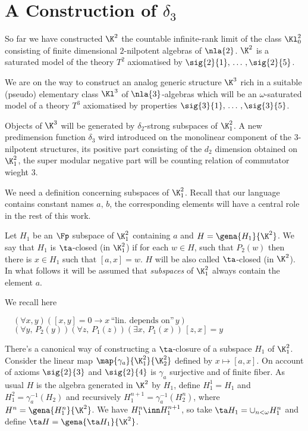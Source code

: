 \section{A Construction of $\delta_{3}$}
So far we have constructed $\K^{2}$ the countable  infinite-rank limit of the class $\Kl^{2}_{0}$ consisting of
finite dimensional $2$-nilpotent algebras of $\nla{2}$.
$\K^{2}$ is a saturated model of the theory
$T^{2}$ axiomatised by $\sig{2}{1},\,\dots\,,\sig{2}{5}$.

We are on the way to construct an analog generic structure $\K^{3}$ rich in a suitable (pseudo) elementary
class $\Kl^{3}$ of $\nla{3}$-algebras which will be an $\omega$-saturated model of a theory $T^{3}$
axiomatised by properties $\sig{3}{1},\,\dots\,,\sig{3}{5}$.

Objects of $\K^{3}$ will be generated by $\delta_{2}$-strong subspaces of $\K^{2}_{1}$.
A new predimension function $\delta_{3}$ wird introduced on the monolinear component of the
$3$-nilpotent structures, its positive part consisting of the $d_{2}$ dimension obtained
on $\K^{2}_{1}$, the super modular negative part will be counting relation of commutator wieght $3$.

\medskip
We need a definition concerning subspaces of $\K^{2}_{1}$.
Recall that our language contains constant names $a,\,b$, the corresponding elements
will have a central role in the rest of this work.

Let $H_{1}$ be an $\Fp$ subspace of $\K^{2}_{1}$ containing
$a$ and $H=\gena{H_{1}}{\K^{2}}$.
We say that $H_{1}$ is $\ta$-closed (in $\K^{2}_{1}$) if for each $w\in H$, such that
$P_{2}(w)$ then there is $x\in H_{1}$ such that $[a,x]=w$. $H$ will be also called
$\ta$-closed (in $\K^{2}$).
In what follows it will be assumed that \emph{subspaces} of $\K^{2}_{1}$
always contain the element $a$.

We recall here

\begin{itemize}
$\quad(\forall x,y)([x,y]=0\rightarrow x\,\text{``lin. depends on''}\,y)$
$\quad(\forall y,\,P_{2}(y))(\forall z,\,P_{1}(z))(\exists x,\,P_{1}(x))\,[z,x]=y$
\end{itemize}

There's a canonical way of constructing a $\ta$-closure of a subspace $H_{1}$ of $\K^{2}_{1}$.
Consider the linear map $\map{\gamma_{a}}{\K^{2}_{1}}{\K^{2}_{2}}$ defined by $x\mapsto[a,x]$.
On account of axioms $\sig{2}{3}$ and $\sig{2}{4}$ is $\gamma_{a}$ surjective and of finite fiber.
As usual $H$ is the algebra generated in $\K^{2}$ by $H_{1}$, define $H^{1}_{1}=H_{1}$ and
$H^{2}_{1}=\gamma_{a}^{-1}(H_{2})$ and recursively
$H^{n+1}_{1}=\gamma_{a}^{-1}(H^{n}_{2})$,
where $H^{n}=\gena{H^{n}_{1}}{\K^{2}}$.
We have $H^{n}_{1}\inn H^{n+1}_{1}$, so take $\ta H_{1}=\cup_{n<\omega}H^{n}_{1}$ and define $\ta H=\gena{\ta H_{1}}{\K^{2}}$.


